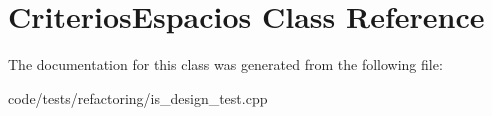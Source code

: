 \hypertarget{class_criterios_espacios}{\section{Criterios\-Espacios Class Reference}
\label{class_criterios_espacios}
}


The documentation for this class was generated from the following file\-:\begin{DoxyCompactItemize}
\item 
code/tests/refactoring/is\-\_\-design\-\_\-test.\-cpp\end{DoxyCompactItemize}
